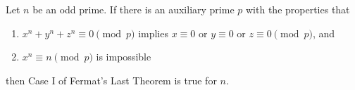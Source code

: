 Let $n$ be an odd prime. If there is an auxiliary prime $p$ with the properties that
\begin{enumerate}
\item $x^n + y^n + z^n \equiv 0 \pmod{p}$ implies $x \equiv 0$ or $y \equiv 0$ or $z \equiv 0 \pmod{p}$, and
\item $x^n \equiv n \pmod{p}$ is impossible
\end{enumerate}
then Case I of Fermat's Last Theorem is true for $n$.
